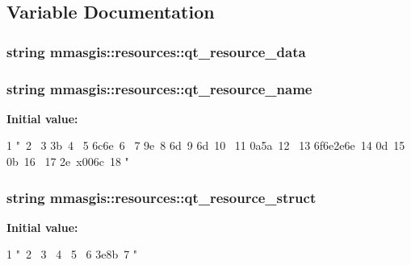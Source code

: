 \subsection{Variable Documentation}
\hypertarget{namespacemmasgis_1_1resources_a1caf04f1a8244ac67c90e332ea20aba2}{
\subsubsection[{qt\_\-resource\_\-data}]{\setlength{\rightskip}{0pt plus 5cm}string {\bf mmasgis::resources::qt\_\-resource\_\-data}}}
\label{namespacemmasgis_1_1resources_a1caf04f1a8244ac67c90e332ea20aba2}
\hypertarget{namespacemmasgis_1_1resources_a81b69b88b6fe79a965a71e645e9b775d}{
\subsubsection[{qt\_\-resource\_\-name}]{\setlength{\rightskip}{0pt plus 5cm}string {\bf mmasgis::resources::qt\_\-resource\_\-name}}}
\label{namespacemmasgis_1_1resources_a81b69b88b6fe79a965a71e645e9b775d}
{\bfseries Initial value:}
\begin{DoxyCode}
1 "\
2 \
3 \x3b\
4 \
5 \x6c\x6e\
6 \
7 \x9e\
8 \x6d\
9 \x6d\
10 \
11 \x0a\x5a\
12 \
13 \x6f\x6e\x2e\x6e\
14 \x0d\
15 \x0b\xdc\
16 \
17 \x2e\
      x00\x6c\
18 "
\end{DoxyCode}
\hypertarget{namespacemmasgis_1_1resources_ac8b49b9b94319f35b2b058e3c929e8f4}{
\subsubsection[{qt\_\-resource\_\-struct}]{\setlength{\rightskip}{0pt plus 5cm}string {\bf mmasgis::resources::qt\_\-resource\_\-struct}}}
\label{namespacemmasgis_1_1resources_ac8b49b9b94319f35b2b058e3c929e8f4}
{\bfseries Initial value:}
\begin{DoxyCode}
1 "\
2 \x00\
3 \
4 \
5 \
6 \x3e\x8b\
7 "
\end{DoxyCode}
